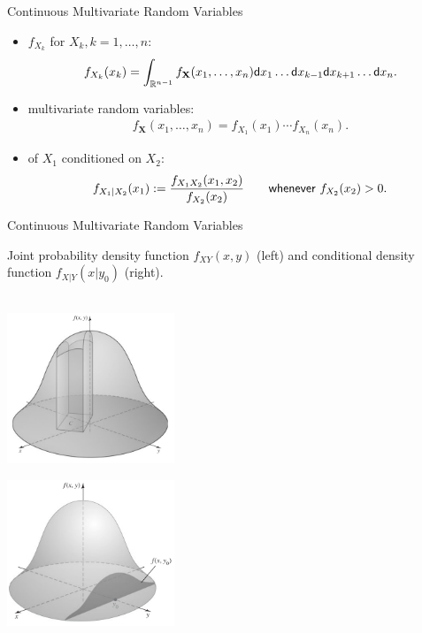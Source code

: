 \begin{frame}{Continuous Multivariate Random Variables}

\justifying
{} 
\begin{itemize}
\item {} $f_{X_k}$ for $X_k, k = 1, \ldots, n$:
\begin{align*}
f_{X_k}(x_k) = \int_{\mathbb{R}^{n-1}} f_{\mathbf{X}}(x_1, \ldots, x_n) \mathsf{d}x_1\ldots \mathsf{d}x_{k-1}\mathsf{d}x_{k+1}\ldots \mathsf{d}x_n.
\end{align*}
\item {} multivariate random variables:
\begin{align*}
f_{\mathbf{X}}(x_1, \ldots, x_n) = f_{X_1}(x_1)\cdots f_{X_n}(x_n).
\end{align*}
\item {} of $X_1$ conditioned on $X_2$:
\begin{align*}
f_{X_1|X_2}(x_1) := \frac{f_{X_1X_2}(x_1, x_2)}{f_{X_2}(x_2)} \qquad \mathsf{whenever\ } f_{X_2}(x_2) > 0.
\end{align*}
\end{itemize}

\end{frame}


\begin{frame}{Continuous Multivariate Random Variables}

\justifying
{} Joint probability density function $f_{XY}(x, y)$ (left) and conditional density function $f_{X|Y}(x|y_0)$ (right).\\
~\\
\begin{minipage}{0.5\linewidth}
	\centering
	\includegraphics[width=5cm]{./images/rc3fig1.png}
\end{minipage}
\begin{minipage}{0.5\linewidth}
	\centering
	\includegraphics[width=5cm]{./images/rc3fig2.png}
\end{minipage}

\end{frame}


